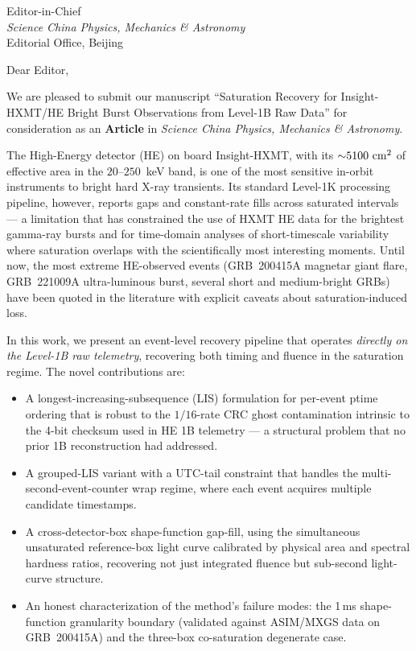 \documentclass[11pt,a4paper]{letter}
\begin{document}
\begin{letter}{Editor-in-Chief \\ \emph{Science China Physics, Mechanics \& Astronomy} \\
Editorial Office, Beijing}

\opening{Dear Editor,}

We are pleased to submit our manuscript ``Saturation Recovery for Insight-HXMT/HE
Bright Burst Observations from Level-1B Raw Data'' for consideration as an
\textbf{Article} in \emph{Science China Physics, Mechanics \& Astronomy}.

The High-Energy detector (HE) on board Insight-HXMT, with its ${\sim}5100~\rm cm^2$
of effective area in the $20$--$250$~keV band, is one of the most sensitive
in-orbit instruments to bright hard X-ray transients. Its standard Level-1K
processing pipeline, however, reports gaps and constant-rate fills across
saturated intervals --- a limitation that has constrained the use of HXMT
HE data for the brightest gamma-ray bursts and for time-domain analyses of
short-timescale variability where saturation overlaps with the scientifically
most interesting moments. Until now, the most extreme HE-observed events
(GRB~200415A magnetar giant flare, GRB~221009A ultra-luminous burst, several
short and medium-bright GRBs) have been quoted in the literature with
explicit caveats about saturation-induced loss.

In this work, we present an event-level recovery pipeline that operates
\emph{directly on the Level-1B raw telemetry}, recovering both timing and
fluence in the saturation regime. The novel contributions are:

\begin{itemize}
\item A longest-increasing-subsequence (LIS) formulation for per-event
ptime ordering that is robust to the $1/16$-rate CRC ghost contamination
intrinsic to the 4-bit checksum used in HE 1B telemetry --- a structural
problem that no prior 1B reconstruction had addressed.
\item A grouped-LIS variant with a UTC-tail constraint that handles the
multi-second-event-counter wrap regime, where each event acquires multiple
candidate timestamps.
\item A cross-detector-box shape-function gap-fill, using the simultaneous
unsaturated reference-box light curve calibrated by physical area and
spectral hardness ratios, recovering not just integrated fluence but
sub-second light-curve structure.
\item An honest characterization of the method's failure modes: the
1\,ms shape-function granularity boundary (validated against ASIM/MXGS
data on GRB~200415A) and the three-box co-saturation degenerate case.
\end{itemize}


\end{letter}
\end{document}
